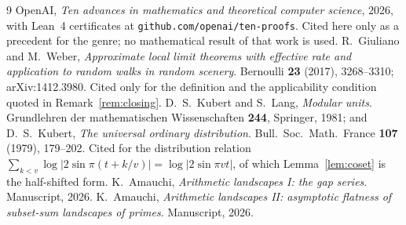 \documentclass[11pt,a4paper]{article}
\theoremstyle{plain}
\theoremstyle{definition}
\theoremstyle{remark}
\begin{document}
\begin{thebibliography}{9}
 OpenAI, \emph{Ten advances in mathematics and theoretical computer
science}, 2026, with Lean~4 certificates at \texttt{github.com/openai/ten-proofs}.
Cited here only as a precedent for the genre; no mathematical result of that work is used.
 R.~Giuliano and M.~Weber, \emph{Approximate local limit theorems with effective
rate and application to random walks in random scenery}. Bernoulli \textbf{23} (2017),
3268--3310; arXiv:1412.3980. Cited only for the definition and the applicability condition
quoted in Remark~\ref{rem:closing}.
 D.~S.~Kubert and S.~Lang, \emph{Modular units}. Grundlehren der mathematischen
Wissenschaften \textbf{244}, Springer, 1981; and D.~S.~Kubert, \emph{The universal ordinary
distribution}. Bull.\ Soc.\ Math.\ France \textbf{107} (1979), 179--202. Cited for the
distribution relation $\sum_{k<v}\log|2\sin\pi(t+k/v)|=\log|2\sin\pi vt|$, of which
Lemma~\ref{lem:coset} is the half-shifted form.
 K.~Amauchi, \emph{Arithmetic landscapes I: the gap series}. Manuscript, 2026.
 K.~Amauchi, \emph{Arithmetic landscapes II: asymptotic flatness of subset-sum
landscapes of primes}. Manuscript, 2026.
\end{thebibliography}
\end{document}
